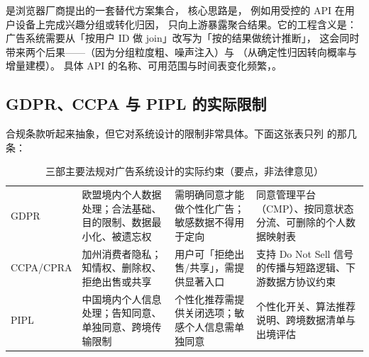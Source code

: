  是浏览器厂商提出的一套替代方案集合，
核心思路是，
例如用受控的 API 在用户设备上完成兴趣分组或转化归因，
只向上游暴露聚合结果。它的工程含义是：
广告系统需要从「按用户 ID 做 join」改写为「按的结果做统计推断」，
这会同时带来两个后果——（因为分组粒度粗、噪声注入）与
（从确定性归因转向概率与增量建模）。
具体 API 的名称、可用范围与时间表变化频繁，。

\subsection{GDPR、CCPA 与 PIPL 的实际限制}

合规条款听起来抽象，但它对系统设计的限制非常具体。下面这张表只列
的那几条：

\begin{table}[htbp]
\centering
\caption{三部主要法规对广告系统设计的实际约束（要点，非法律意见）}
\label{tab:privacy-laws}
\small
\begin{tabularx}{\textwidth}{L{1.8cm} L{3.2cm} L{3.6cm} Y}
\toprule
{} &  &  &  \\
\midrule
GDPR & 欧盟境内个人数据处理；合法基础、目的限制、数据最小化、被遗忘权 & 需明确同意才能做个性化广告；敏感数据不得用于定向 & 同意管理平台（CMP）、按同意状态分流、可删除的个人数据映射表 \\
\addlinespace
CCPA/CPRA & 加州消费者隐私；知情权、删除权、拒绝出售或共享 & 用户可「拒绝出售/共享」，需提供显著入口 & 支持 Do Not Sell 信号的传播与短路逻辑、下游数据方协议约束 \\
\addlinespace
PIPL & 中国境内个人信息处理；告知同意、单独同意、跨境传输限制 & 个性化推荐需提供关闭选项；敏感个人信息需单独同意 & 个性化开关、算法推荐说明、跨境数据清单与出境评估 \\
\bottomrule
\end{tabularx}
\end{table}

